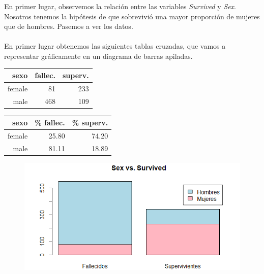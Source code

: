 \documentclass{article}
\begin{document}
En primer lugar, observemos la relación entre las variables \textit{Survived} y \textit{Sex}. Nosotros tenemos la hipótesis de que sobrevivió una mayor proporción de mujeres que de hombres. Pasemos a ver los datos.\\\\
En primer lugar obtenemos las siguientes tablas cruzadas, que vamos a representar gráficamente en un diagrama de barras apiladas.
\begin{table}[htbp]
    \centering
    \begin{minipage}{.5\textwidth}
        \centering
        \begin{tabular}{rrr}
            \hline
           sexo & fallec. & superv. \\ 
            \hline
            female &  81 & 233 \\ 
            male & 468 & 109 \\ 
            \hline
        \end{tabular}
    \end{minipage}%
    \begin{minipage}{.5\textwidth}
        \centering
        \begin{tabular}{rrr}
            \hline
            sexo & \% fallec. & \% superv. \\ 
            \hline
            female & 25.80 & 74.20 \\ 
            male & 81.11 & 18.89 \\ 
            \hline
        \end{tabular}
    \end{minipage}
\end{table}

\begin{figure}[!h]
    \centering
    \includegraphics[width=0.7\linewidth]{content/sex_surv.png}
\end{figure}
\end{document}
